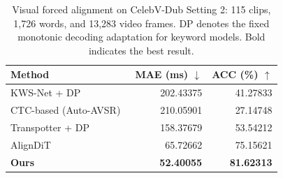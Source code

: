 \begin{table}[!t]
\centering
\caption{Visual forced alignment on CelebV-Dub Setting 2: 115 clips, 1,726 words, and 13,283 video frames. DP denotes the fixed monotonic decoding adaptation for keyword models. Bold indicates the best result.}
\label{tab:vfa}
\footnotesize
\setlength{\tabcolsep}{3pt}
\begin{tabular}{@{}lrr@{}}
\toprule
Method & MAE (ms) $\downarrow$ & ACC (\%) $\uparrow$ \\
\midrule
KWS-Net + DP~\cite{momeni2020kwsnet} & 202.43375 & 41.27833 \\
CTC-based (Auto-AVSR)~\cite{ma2023autoavsr,kurzinger2020ctcsegmentation} & 210.05901 & 27.14748 \\
Transpotter + DP~\cite{prajwal2021transpotter} & 158.37679 & 53.54212 \\
AlignDiT~\cite{choi2025aligndit} & 65.72662 & 75.15621 \\
\midrule
\textbf{Ours} & \textbf{52.40055} & \textbf{81.62313} \\
\bottomrule
\end{tabular}
\end{table}
